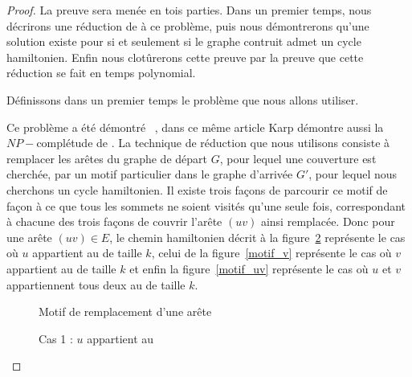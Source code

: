 \begin{proof}
    La preuve sera menée en tois parties. Dans un premier temps, nous décrirons une
    réduction de \vcover à ce problème, puis nous démontrerons qu'une solution existe pour \vcover
    si et seulement si le graphe contruit admet un cycle hamiltonien. Enfin nous clotûrerons cette
    preuve par la preuve que cette réduction se fait en temps polynomial.

    Définissons dans un premier temps le problème \vcover que nous allons utiliser.


    Ce problème a été démontré \npc~\cite{karp}, dans ce même article Karp démontre aussi
    la $NP-$complétude de \hcycle. %
    La technique de réduction que nous utilisons consiste à remplacer les
    arêtes du graphe de départ $G$, pour lequel une couverture est cherchée, par un motif
    particulier dans le graphe d'arrivée $G'$, pour lequel nous cherchons un cycle hamiltonien.
    Il existe trois façons de parcourir ce motif de façon à ce que tous les sommets ne soient
    visités qu'une seule fois, correspondant à chacune des trois façons de couvrir l'arête $(uv)$
    ainsi remplacée. Donc pour une arête $(uv) \in E$, le chemin
    hamiltonien décrit à la figure~\ref{motif_u} représente le cas où $u$ appartient au \vcover de
    taille $k$, celui de la figure~\ref{motif_v} représente le cas où $v$ appartient au \vcover de
    taille $k$ et enfin la figure~\ref{motif_uv} représente le cas où $u$ et $v$ appartiennent tous
    deux au \vcover de taille $k$.

    \begin{figure}
        \begin{center}
            \begin{tikzpicture}
                
            \end{tikzpicture}
            \caption{Motif de remplacement d'une arête}
            \label{motif_npc}
        \end{center}
    \end{figure}

    \begin{figure}
        \begin{center}
            \begin{tikzpicture}
                
            \end{tikzpicture}
            \caption{Cas 1 : $u$ appartient au \vcover}
            \label{motif_u}
        \end{center}
    \end{figure}


\end{proof}
